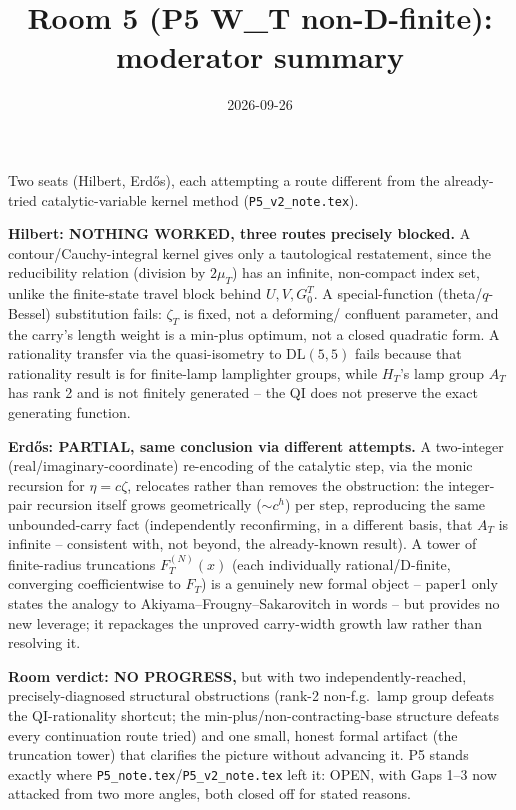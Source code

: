 \documentclass[11pt]{article}
\title{Room 5 (P5 W\_T non-D-finite): moderator summary}
\date{2026-09-26}
\begin{document}
\maketitle

Two seats (Hilbert, Erd\H os), each attempting a route different from the already-tried
catalytic-variable kernel method (\texttt{P5\_v2\_note.tex}).

\textbf{Hilbert: NOTHING WORKED, three routes precisely blocked.} A contour/Cauchy-integral kernel
gives only a tautological restatement, since the reducibility relation (division by $2\mu_T$) has
an infinite, non-compact index set, unlike the finite-state travel block behind $U,V,G^T_0$. A
special-function (theta/$q$-Bessel) substitution fails: $\zeta_T$ is fixed, not a deforming/
confluent parameter, and the carry's length weight is a min-plus optimum, not a closed quadratic
form. A rationality transfer via the quasi-isometry to $\mathrm{DL}(5,5)$ fails because that
rationality result is for finite-lamp lamplighter groups, while $H_T$'s lamp group $A_T$ has rank 2
and is not finitely generated -- the QI does not preserve the exact generating function.

\textbf{Erd\H os: PARTIAL, same conclusion via different attempts.} A two-integer
(real/imaginary-coordinate) re-encoding of the catalytic step, via the monic recursion for
$\eta=c\zeta$, relocates rather than removes the obstruction: the integer-pair recursion itself
grows geometrically ($\sim c^h$) per step, reproducing the same unbounded-carry fact (independently
reconfirming, in a different basis, that $A_T$ is infinite -- consistent with, not beyond, the
already-known result). A tower of finite-radius truncations $F_T^{(N)}(x)$ (each individually
rational/D-finite, converging coefficientwise to $F_T$) is a genuinely new formal object -- paper1
only states the analogy to Akiyama--Frougny--Sakarovitch in words -- but provides no new leverage;
it repackages the unproved carry-width growth law rather than resolving it.

\textbf{Room verdict: NO PROGRESS,} but with two independently-reached, precisely-diagnosed
structural obstructions (rank-2 non-f.g.\ lamp group defeats the QI-rationality shortcut; the
min-plus/non-contracting-base structure defeats every continuation route tried) and one small,
honest formal artifact (the truncation tower) that clarifies the picture without advancing it. P5
stands exactly where \texttt{P5\_note.tex}/\texttt{P5\_v2\_note.tex} left it: OPEN, with Gaps 1--3
now attacked from two more angles, both closed off for stated reasons.
\end{document}

